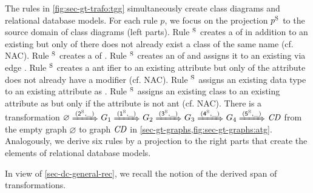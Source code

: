 \begin{example}
\label{ex:sec-gt-trafo:trafo}
The rules in \cref{fig:sec-gt-trafo:tgg} simultaneously create class diagrams and relational database models.
For each rule $p$, we focus on the projection $p^\mathrm{S}$ to the source domain of class diagrams (left parts).
Rule $^\mathrm{S}$ creates a  of   in addition to an existing  but only of there does not already exist a class of the same name (cf. NAC).
Rule $^\mathrm{S}$ creates a  of  .
Rule $^\mathrm{S}$ creates an  of   and assigns it to an existing  via edge .
Rule $^\mathrm{S}$ creates a ant ifier to an existing attribute but only of the attribute does not already have a modifier (cf. NAC).
Rule $^\mathrm{S}$ assigns an existing data type to an existing attribute as .
Rule $^\mathrm{S}$ assigns an existing class to an existing attribute as  but only if the attribute is not ant (cf. NAC).
There is a transformation $\varnothing \Trans{(\code{2}^\SRC,\_)} G_1 \Trans{(\code{1}^\SRC,\_)} G_2 \Trans{(\code{3}^\SRC,\_)} G_3 \Trans{(\code{4}^\SRC,\_)} G_4 \Trans{(\code{5}^\SRC,\_)} \CD$ from the empty graph $\varnothing$ to graph $\mathit{CD}$ in \cref{sec-gt-graphs,fig:sec-gt-graphs:atg}.
Analogously, we derive six rules by a projection to the right parts that create the elements of relational database models.
\envEndMarker
\end{example}

In view of \cref{sec-dc-general-rec}, we recall the notion of the derived span of transformations.

